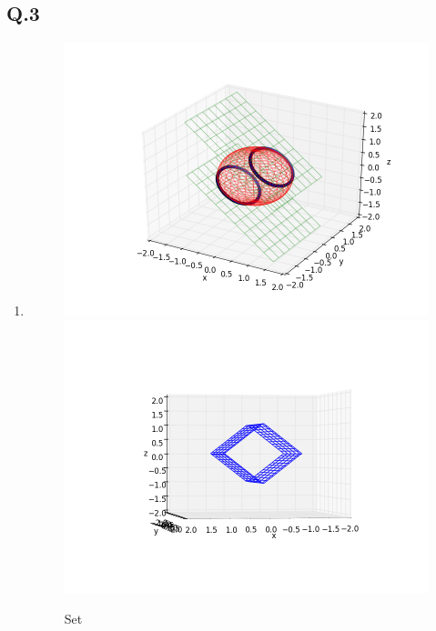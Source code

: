 \documentclass[12pt]{article}
\newcommand{\Q}[1]{\subsection*{Q.#1}}
\newenvironment{question}[1]
{\Q{#1}}{}
\begin{document}
\begin{question}{3}
  \begin{enumerate}
  \item 

    \begin{figure}[ht]
      \centering
      \includegraphics[scale=0.4]{nucnormset1.png}
      \includegraphics[scale=0.4]{nucnormset2.png}
      \caption{\label{fig:q3} Set}
    \end{figure}


\end{enumerate}
\end{question}
\end{document}
